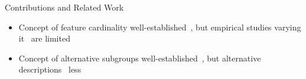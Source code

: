 \documentclass[en, navbaroff, handout]{sdqbeamer}
\begin{document}
\begin{frame}[t]{Contributions and Related Work}
\begin{itemize}
\begin{itemize}
			\item Concept of feature cardinality well-established~\cite{herrera2011overview, meeng2021real}, but empirical studies varying it~\cite{friedman1999bump, lemmerich2010fast, meeng2021real, proencca2022robust} are limited
			\item Concept of alternative subgroups well-established~\cite{atzmueller2015subgroup, belfodil2019fssd, bosc2018anytime, leeuwen2012diverse, lucas2018ssdp+}, but alternative descriptions~\cite{boley2009non, galbrun2017redescription, leeuwen2012diverse, lopez2023discovering} less
		\end{itemize}
	\end{itemize}
\end{frame}
\end{document}
